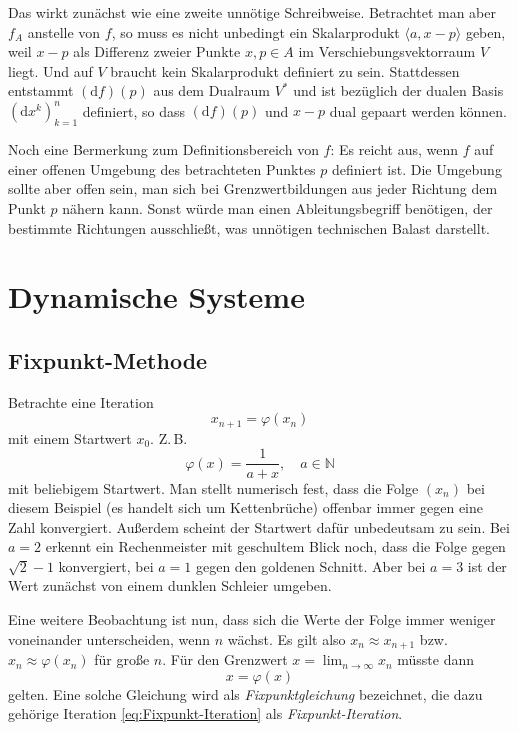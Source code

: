 \documentclass[a4paper,11pt,fleqn,twoside]{scrartcl}
\numberwithin{equation}{section}
\newcommand{\N}{\mathbb N}
\begin{document}
Das wirkt zunächst wie eine zweite unnötige Schreibweise. Betrachtet
man aber $f_A$ anstelle von $f$, so muss es nicht unbedingt ein
Skalarprodukt $\langle a,x-p\rangle$ geben, weil $x-p$ als
Differenz zweier Punkte $x,p\in A$ im Verschiebungsvektorraum
$V$ liegt. Und auf $V$ braucht kein Skalarprodukt definiert zu sein.
Stattdessen entstammt $(\mathrm df)(p)$ aus dem Dualraum $V^\ast$
und ist bezüglich der dualen Basis $(\mathrm dx^k)_{k=1}^n$ definiert,
so dass $(\mathrm df)(p)$ und $x-p$ dual gepaart werden können.

Noch eine Bermerkung zum Definitionsbereich von $f$: Es reicht aus,
wenn $f$ auf einer offenen Umgebung des betrachteten Punktes $p$
definiert ist. Die Umgebung sollte aber offen sein, man sich bei
Grenzwertbildungen aus jeder Richtung dem Punkt $p$ nähern kann.
Sonst würde man einen Ableitungsbegriff benötigen, der bestimmte
Richtungen ausschließt, was unnötigen
technischen Balast darstellt.

\section{Dynamische Systeme}
\subsection{Fixpunkt-Methode}
Betrachte eine Iteration
\begin{equation}\label{eq:Fixpunkt-Iteration}
x_{n+1}=\varphi(x_n)
\end{equation}
mit einem Startwert $x_0$. Z.\,B.
\begin{equation}
\varphi(x) = \frac{1}{a+x},\quad a\in\N
\end{equation}
mit beliebigem Startwert. Man stellt numerisch fest, dass die
Folge $(x_n)$ bei diesem Beispiel (es handelt sich um Kettenbrüche)
offenbar immer gegen eine Zahl konvergiert. Außerdem
scheint der Startwert dafür unbedeutsam zu sein. Bei $a=2$ erkennt
ein Rechenmeister mit geschultem Blick noch, dass die Folge
gegen $\sqrt{2}-1$ konvergiert, bei $a=1$ gegen den goldenen Schnitt.
Aber bei $a=3$ ist der Wert zunächst von einem dunklen Schleier
umgeben.

Eine weitere Beobachtung ist nun, dass sich die Werte der Folge
immer weniger voneinander unterscheiden, wenn $n$ wächst.
Es gilt also $x_n\approx x_{n+1}$ bzw. $x_n\approx \varphi(x_n)$
für große $n$. Für den Grenzwert $x=\lim_{n\to\infty} x_n$ müsste
dann
\begin{equation}
x = \varphi(x)
\end{equation}
gelten. Eine solche Gleichung wird als \emph{Fixpunktgleichung}
bezeichnet, die dazu gehörige Iteration \eqref{eq:Fixpunkt-Iteration}
als \emph{Fixpunkt-Iteration}.
\end{document}
